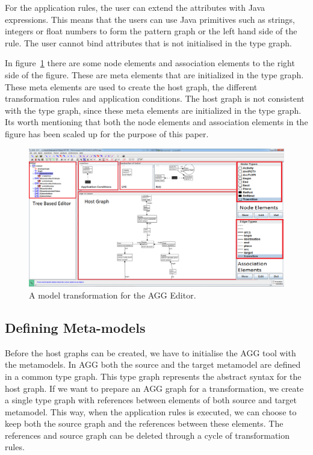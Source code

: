 For the application rules, the user can extend the attributes with Java
expressions. This means that the users can use Java primitives such as strings,
integers or float numbers to form the pattern graph or the left hand side of
the rule. The user cannot bind attributes that is not initialised in the type graph.

In figure~\ref{fig:AGGScreen} there are some node elements and association
elements to the right side of the figure. These are meta elements that are
initialized in the type graph. These meta elements are used to create the host
graph, the different transformation rules and application conditions. The host
graph is not consistent with the type graph, since these meta elements are
initialized in the type graph. Its worth mentioning that both the
node elements and association elements in the figure has been scaled up for the
purpose of this paper.

\begin{figure}[H]
	\centering
	\includegraphics[scale=0.3]{figures/AGGscreen.png}
	\caption[Graphical Editor for AGG]
	{A model transformation for the AGG Editor.}
	\label{fig:AGGScreen}
\end{figure}

\subsection{Defining Meta-models}

Before the host graphs can be created, we have to initialise the AGG
tool with the metamodels. In AGG both the source and the target metamodel are
defined in a common type graph. This type graph represents the abstract syntax
for the host graph. If we want to prepare an AGG graph for a transformation, we
create a single type graph with references between elements of both source and
target metamodel. This way, when the application rules is executed, we can
choose to keep both the source graph and the references between these elements.
The references and source graph can be deleted through a cycle of transformation rules.

